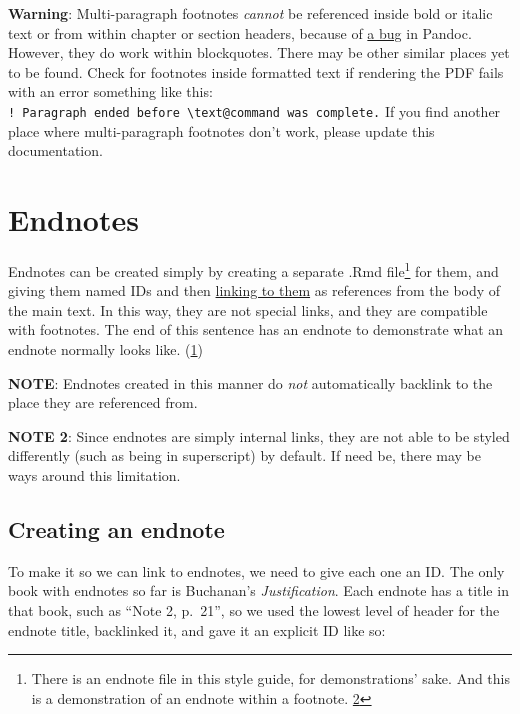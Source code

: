 \documentclass[
]{book}
\begin{document}
\textbf{Warning}: Multi-paragraph footnotes \emph{cannot} be referenced inside bold or italic text or from within chapter or section headers, because of \href{https://github.com/jgm/pandoc/issues/6733}{a bug} in Pandoc. However, they do work within blockquotes. There may be other similar places yet to be found. Check for footnotes inside formatted text if rendering the PDF fails with an error something like this: \texttt{!\ Paragraph\ ended\ before\ \textbackslash{}text@command\ was\ complete.} If you find another place where multi-paragraph footnotes don't work, please update this documentation.

\hypertarget{endnotes}{%
\section{Endnotes}\label{endnotes}}

Endnotes can be created simply by creating a separate .Rmd file\footnote{There is an endnote file in this style guide, for demonstrations' sake. And this is a demonstration of an endnote within a footnote. \protect\hyperlink{en.02ux5cux257Bux5cux23en.02.backlinkux5cux257D}{2}} for them, and giving them named IDs and then \protect\hyperlink{linking-to-an-endnote}{linking to them} as references from the body of the main text. In this way, they are not special links, and they are compatible with footnotes. The end of this sentence has an endnote to demonstrate what an endnote normally looks like. (\protect\hypertarget{en.01.backlink}{\protect\hyperlink{en.01}{1}})

\textbf{NOTE}: Endnotes created in this manner do \emph{not} automatically backlink to the place they are referenced from.

\textbf{NOTE 2}: Since endnotes are simply internal links, they are not able to be styled differently (such as being in superscript) by default. If need be, there may be ways around this limitation.

\hypertarget{creating-an-endnote}{%
\subsection{Creating an endnote}\label{creating-an-endnote}}

To make it so we can link to endnotes, we need to give each one an ID. The only book with endnotes so far is Buchanan's \emph{Justification}. Each endnote has a title in that book, such as ``Note 2, p.~21'', so we used the lowest level of header for the endnote title, backlinked it, and gave it an explicit ID like so:
\end{document}
